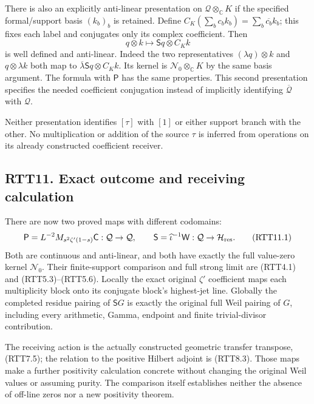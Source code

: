 There is also an explicitly anti-linear presentation on
\(\mathcal Q\otimes_{\mathbb C}K\) if the specified formal/support basis
\((k_b)_b\) is retained. Define
\(C_K(\sum_b c_bk_b)=\sum_b\overline{c_b}k_b\); this fixes each label
and conjugates only its complex coefficient. Then \[
q\otimes k\longmapsto\mathsf Sq\otimes C_Kk
\tag{RTT10.3}
\] is well defined and anti-linear. Indeed the two representatives
\((\lambda q)\otimes k\) and \(q\otimes\lambda k\) both map to
\(\overline\lambda\mathsf Sq\otimes C_Kk\). Its kernel is
\(\mathcal N_0\otimes_{\mathbb C}K\) by the same basis argument. The
formula with \(\mathsf P\) has the same properties. This second
presentation specifies the needed coefficient conjugation instead of
implicitly identifying \(\overline{\mathcal Q}\) with \(\mathcal Q\).

Neither presentation identifies \([\tau]\) with \([1]\) or either
support branch with the other. No multiplication or addition of the
source \(\tau\) is inferred from operations on its already constructed
coefficient receiver.

\subsection{RTT11. Exact outcome and receiving
calculation}\label{rtt11.-exact-outcome-and-receiving-calculation}

There are now two proved maps with different codomains: \[
\mathsf P=L^{-2}M_{s^2\zeta'(1-s)}\mathsf C:\mathcal Q\to\mathcal Q,
\qquad
\mathsf S=\widehat\iota^{-1}\mathsf W:\mathcal Q\to\mathcal H_{\rm res}.
\tag{RTT11.1}
\] Both are continuous and anti-linear, and both have exactly the full
value-zero kernel \(\mathcal N_0\). Their finite-support comparison and
full strong limit are (RTT4.1) and (RTT5.3)--(RTT5.6). Locally the exact
original \(\zeta'\) coefficient maps each multiplicity block onto its
conjugate block's highest-jet line. Globally the completed residue
pairing of \(\mathsf S G\) is exactly the original full Weil pairing of
\(G\), including every arithmetic, Gamma, endpoint and finite
trivial-divisor contribution.

The receiving action is the actually constructed geometric transfer
transpose, (RTT7.5); the relation to the positive Hilbert adjoint is
(RTT8.3). Those maps make a further positivity calculation concrete
without changing the original Weil values or assuming purity. The
comparison itself establishes neither the absence of off-line zeros nor
a new positivity theorem.

